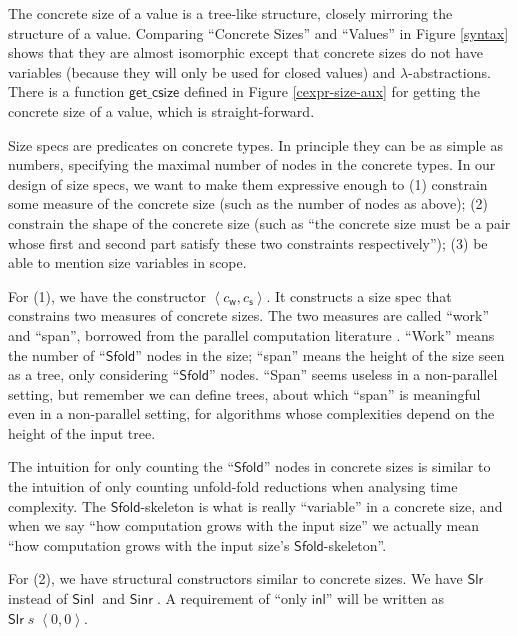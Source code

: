 \documentclass[preprint]{sigplanconf}
\newcommand{\syminl}{\mathsf{inl}}
\newcommand{\symSinl}{\mathsf{Sinl\;}}
\newcommand{\symSinr}{\mathsf{Sinr\;}}
\newcommand{\symSfold}{\mathsf{Sfold}}
\newcommand{\getcsize}{\mathsf{get\_csize}}
\newcommand{\symSlr}{\mathsf{Slr}}
\newcommand{\symwork}{\mathsf{w}}
\newcommand{\symspan}{\mathsf{s}}
\newcommand{\Sstats}[1]{\left \langle #1 \right \rangle}
\begin{document}
The concrete size of a value is a tree-like structure, closely mirroring the structure of a value. Comparing ``Concrete Sizes'' and ``Values'' in Figure \ref{syntax} shows that they are almost isomorphic except that concrete sizes do not have variables (because they will only be used for closed values) and $\lambda$-abstractions. There is a function $\getcsize$ defined in Figure \ref{cexpr-size-aux} for getting the concrete size of a value, which is straight-forward.

Size specs are predicates on concrete types. In principle they can be as simple as numbers, specifying the maximal number of nodes in the concrete types. In our design of size specs, we want to make them expressive enough to (1) constrain some measure of the concrete size (such as the number of nodes as above); (2) constrain the shape of the concrete size (such as ``the concrete size must be a pair whose first and second part satisfy these two constraints respectively''); (3) be able to mention size variables in scope.

For (1), we have the constructor $\Sstats{c_\symwork,c_\symspan}$. It constructs a size spec that constrains two measures of concrete sizes. The two measures are called ``work'' and ``span'', borrowed from the parallel computation literature \cite{parallelbook}. ``Work'' means the number of ``$\symSfold$'' nodes in the size; ``span'' means the height of the size seen as a tree, only considering ``$\symSfold$'' nodes. ``Span'' seems useless in a non-parallel setting, but remember we can define trees, about which ``span'' is meaningful even in a non-parallel setting, for algorithms whose complexities depend on the height of the input tree. 

The intuition for only counting the  ``$\symSfold$'' nodes in concrete sizes is similar to the intuition of only counting unfold-fold reductions when analysing time complexity. The $\symSfold$-skeleton is what is really ``variable'' in a concrete size, and when we say ``how computation grows with the input size'' we actually mean ``how computation grows with the input size's $\symSfold$-skeleton''.

For (2), we have structural constructors similar to concrete sizes. We have $\symSlr$ instead of $\symSinl$ and $\symSinr$. A requirement of ``only $\syminl$'' will be written as $\symSlr\;s\;\Sstats{0,0}$.
\end{document}
